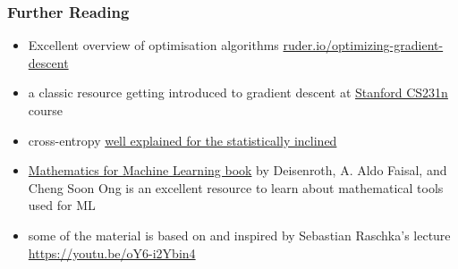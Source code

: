 \documentclass[
  aspectratio=1610, %
  intlimits %
]{beamer}
\begin{document}
   \begin{frame}
     \frametitle{Further Reading}

     \vfill
     \begin{itemize}
     \item Excellent overview of optimisation algorithms \href{https://ruder.io/optimizing-gradient-descent/}{ruder.io/optimizing-gradient-descent}
     \item a classic resource getting introduced to gradient descent at \href{https://cs231n.github.io/optimization-1/}{Stanford CS231n} course

     \item cross-entropy \href{https://towardsdatascience.com/data-science-interview-deep-dive-cross-entropy-loss-b10355eb4ace}{well explained for the statistically inclined}
     \item \href{https://mml-book.github.io/}{Mathematics for Machine Learning book} by Deisenroth, A. Aldo Faisal, and Cheng Soon Ong is an excellent resource to learn about mathematical tools used for ML

     \item some of the material is based on and inspired by Sebastian Raschka's lecture \href{L6.2 Understanding Automatic Differentiation via Computation Graphs}{https://youtu.be/oY6-i2Ybin4}

     \end{itemize}
     \vfill
   \end{frame}


\end{document}
